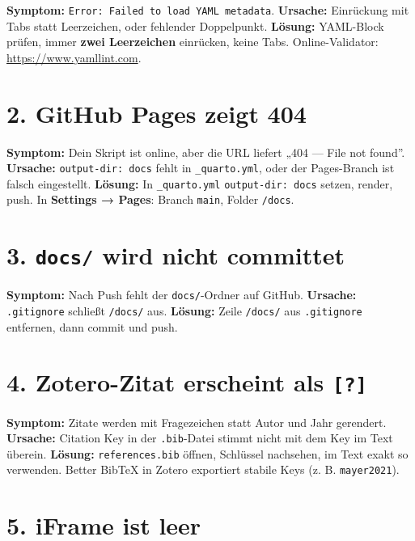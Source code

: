 \documentclass[
  ngerman,
  a4paper,
  DIV=11]{scrreprt}
\begin{document}
\textbf{Symptom:} \texttt{Error:\ Failed\ to\ load\ YAML\ metadata}.
\textbf{Ursache:} Einrückung mit Tabs statt Leerzeichen, oder fehlender
Doppelpunkt. \textbf{Lösung:} YAML-Block prüfen, immer \textbf{zwei
Leerzeichen} einrücken, keine Tabs. Online-Validator:
\url{https://www.yamllint.com}.

\section{2. GitHub Pages zeigt 404}\label{github-pages-zeigt-404}

\textbf{Symptom:} Dein Skript ist online, aber die URL liefert „404 ---
File not found''. \textbf{Ursache:} \texttt{output-dir:\ docs} fehlt in
\texttt{\_quarto.yml}, oder der Pages-Branch ist falsch eingestellt.
\textbf{Lösung:} In \texttt{\_quarto.yml} \texttt{output-dir:\ docs}
setzen, render, push. In \textbf{Settings → Pages}: Branch
\texttt{main}, Folder \texttt{/docs}.

\section{\texorpdfstring{3. \texttt{docs/} wird nicht
committet}{3. docs/ wird nicht committet}}\label{docs-wird-nicht-committet}

\textbf{Symptom:} Nach Push fehlt der \texttt{docs/}-Ordner auf GitHub.
\textbf{Ursache:} \texttt{.gitignore} schließt \texttt{/docs/} aus.
\textbf{Lösung:} Zeile \texttt{/docs/} aus \texttt{.gitignore}
entfernen, dann commit und push.

\section{\texorpdfstring{4. Zotero-Zitat erscheint als
\texttt{{[}?{]}}}{4. Zotero-Zitat erscheint als {[}?{]}}}\label{zotero-zitat-erscheint-als}

\textbf{Symptom:} Zitate werden mit Fragezeichen statt Autor und Jahr
gerendert. \textbf{Ursache:} Citation Key in der \texttt{.bib}-Datei
stimmt nicht mit dem Key im Text überein. \textbf{Lösung:}
\texttt{references.bib} öffnen, Schlüssel nachsehen, im Text exakt so
verwenden. Better BibTeX in Zotero exportiert stabile Keys (z. B.
\texttt{mayer2021}).

\section{5. iFrame ist leer}\label{iframe-ist-leer}
\end{document}
